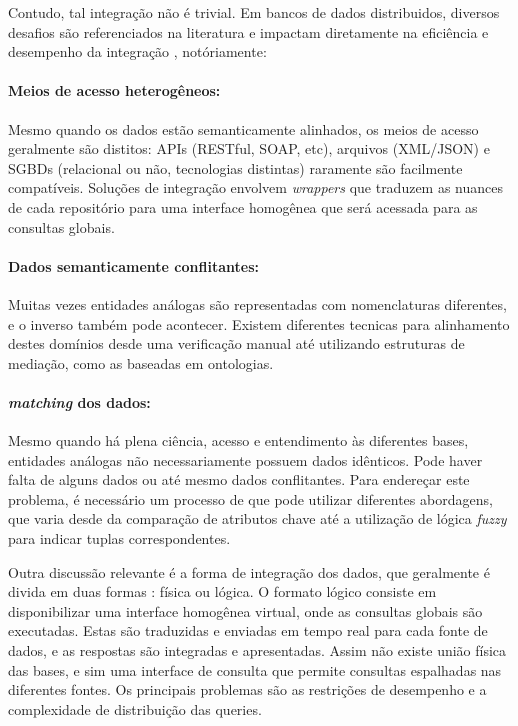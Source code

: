 \documentclass[a4paper,12pt]{monografia}
\theoremstyle{plain}
\theoremstyle{definition}
\theoremstyle{remark}
\begin{document}
Contudo, tal integração não é trivial. Em bancos de dados distribuidos, diversos desafios são referenciados na literatura e impactam diretamente na eficiência e desempenho da integração \cite{ozsu2011}, notóriamente:

\paragraph{Meios de acesso heterogêneos:} Mesmo quando os dados estão semanticamente alinhados, os meios de acesso geralmente são distitos: APIs (RESTful, SOAP, etc), arquivos (XML/JSON) e SGBDs (relacional ou não, tecnologias distintas) raramente são facilmente compatíveis. Soluções de integração envolvem \textit{wrappers} que traduzem as nuances de cada repositório para uma interface homogênea que será acessada para as consultas globais.

\paragraph{Dados semanticamente conflitantes:} Muitas vezes entidades análogas são representadas com nomenclaturas diferentes, e o inverso também pode acontecer. Existem diferentes tecnicas para alinhamento destes domínios desde uma  verificação manual até utilizando estruturas de mediação, como as baseadas em ontologias.

\paragraph{\textit{matching} dos dados:} Mesmo quando há plena ciência, acesso e entendimento às diferentes bases, entidades análogas não necessariamente possuem dados idênticos. Pode haver falta de alguns dados ou até mesmo dados conflitantes. Para endereçar este problema, é necessário um processo de  que pode utilizar diferentes abordagens, que varia desde da comparação de atributos chave até a utilização de lógica \textit{fuzzy} para indicar tuplas correspondentes.

Outra discussão relevante é a forma de integração dos dados, que geralmente é divida em duas formas : física ou lógica\cite{ozsu2011}. O formato lógico consiste em disponibilizar uma interface homogênea virtual, onde as consultas globais são executadas. Estas são traduzidas e enviadas em tempo real para cada fonte de dados, e as respostas são integradas e apresentadas. Assim não existe união física das bases, e sim uma interface de consulta que permite consultas espalhadas nas diferentes fontes. Os principais problemas são as restrições de desempenho e a complexidade de distribuição das queries.
\end{document}
